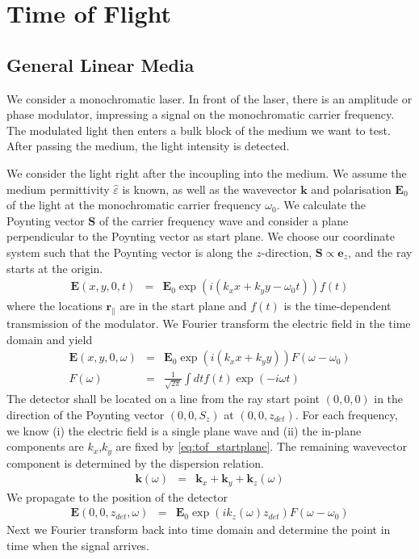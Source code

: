 \documentclass[12pt,a4paper,twoside,openright,BCOR10mm,headsepline,titlepage,abstracton,chapterprefix,final]{scrreprt}
\newcommand\Vector[1]{{\mathbf{#1}}}
\newcommand\Location{\Vector{r}}
\newcommand\wavenumber{k}
\newcommand\Wavevector{\Vector{\wavenumber}}
\newcommand\Tensor[1]{\hat{#1}}
\newcommand\scalarEfield{E}
\newcommand\Efield{\Vector{\scalarEfield}}
\newcommand\permittivity{\Tensor{\scalarpermittivity}}
\newcommand\scalarpermittivity{\varepsilon}
\begin{document}
\section{Time of Flight}
\subsection{General Linear Media}
We consider a monochromatic laser. 
In front of the laser, there is an amplitude or phase modulator, impressing a signal on the monochromatic carrier frequency.
The modulated light then enters a bulk block of the medium we want to test.
After passing the medium, the light intensity is detected.

We consider the light right after the incoupling into the medium.
We assume the medium permittivity $\permittivity$ is known,
as well as the wavevector $\Wavevector$ and polarisation $\Efield_0$ of the light at the monochromatic carrier frequency $\omega_0$.
We calculate the Poynting vector $\Vector{S}$ of the carrier frequency wave 
and consider a plane perpendicular to the Poynting vector as start plane.
We choose our coordinate system such that the Poynting vector is along the $z$-direction, $\Vector{S} \propto \Vector{e}_z$,
and the ray starts at the origin.
\begin{eqnarray}
 \Efield(x,y,0, t) &=& \Efield_0 \exp (i ( \wavenumber_x x + \wavenumber_y y - \omega_0 t)) f(t)
\end{eqnarray}
where the locations $\Location_\parallel$ are in the start plane and $f(t)$ is the time-dependent transmission of the modulator.
We Fourier transform the electric field in the time domain and yield
\begin{eqnarray}
 \Efield(x,y,0, \omega) &=& \Efield_0  \exp (i ( \wavenumber_x x+ \wavenumber_y y)) F(\omega-\omega_0) \label{eq:tof_startplane}\\
 F(\omega) &=& \frac{1}{\sqrt{2\pi}} \int dt f(t) \exp(-i \omega t)
\end{eqnarray}
The detector shall be located on a line from the ray start point $(0,0,0)$ in the direction of the Poynting vector $(0,0,S_z)$
at $(0,0,z_{det})$.
For each frequency, we know 
(i) the electric field is a single plane wave and 
(ii) the in-plane components are $\wavenumber_x$,$\wavenumber_y$ are fixed by \eqref{eq:tof_startplane}.
The remaining wavevector component is determined by the dispersion relation.
\begin{eqnarray}
 \Wavevector(\omega) &=& \Wavevector_x + \Wavevector_y + \Wavevector_z(\omega)
\end{eqnarray}
We propagate to the position of the detector
\begin{eqnarray}
\Efield(0, 0, z_{det}, \omega) &=& \Efield_0  \exp (i \wavenumber_z(\omega) z_{det}) F(\omega-\omega_0) 
\end{eqnarray}
Next we Fourier transform back into time domain and determine the point in time when the signal arrives.
\end{document}
